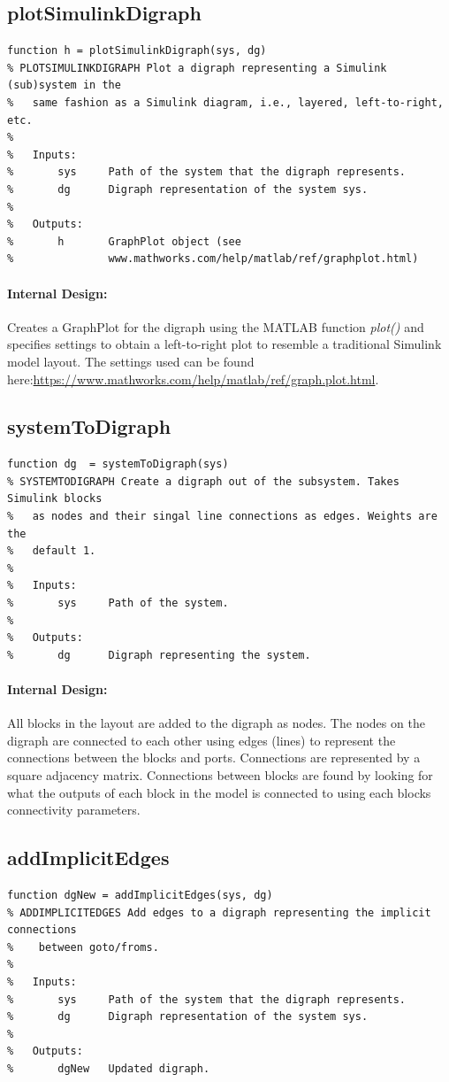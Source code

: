 \documentclass[12pt,letterpaper]{report}
\begin{document}
\subsection{plotSimulinkDigraph}
\begin{lstlisting}
function h = plotSimulinkDigraph(sys, dg)
% PLOTSIMULINKDIGRAPH Plot a digraph representing a Simulink (sub)system in the
%   same fashion as a Simulink diagram, i.e., layered, left-to-right, etc.
%
%   Inputs:
%       sys     Path of the system that the digraph represents.
%       dg      Digraph representation of the system sys.
%
%   Outputs:
%       h       GraphPlot object (see
%               www.mathworks.com/help/matlab/ref/graphplot.html)
\end{lstlisting}
\paragraph{Internal Design:} Creates a GraphPlot for the digraph using the MATLAB function \textit{plot()} and specifies settings to obtain a left-to-right plot to resemble a traditional Simulink model layout. The settings used can be found here:\url{https://www.mathworks.com/help/matlab/ref/graph.plot.html}.

\subsection{systemToDigraph}
\begin{lstlisting}
function dg  = systemToDigraph(sys)
% SYSTEMTODIGRAPH Create a digraph out of the subsystem. Takes Simulink blocks
%   as nodes and their singal line connections as edges. Weights are the
%   default 1.
%
%   Inputs:
%       sys     Path of the system.
%
%   Outputs:
%       dg      Digraph representing the system.
\end{lstlisting}
\paragraph{Internal Design:} All blocks in the layout are added to the digraph as nodes. The nodes on the digraph are connected to each other using edges (lines) to represent the connections between the blocks and ports. Connections are represented by a square adjacency matrix. Connections between blocks are found by looking for what the outputs of each block in the model is connected to using each blocks connectivity parameters.

\subsection{addImplicitEdges}
\begin{lstlisting}
function dgNew = addImplicitEdges(sys, dg)
% ADDIMPLICITEDGES Add edges to a digraph representing the implicit connections
%    between goto/froms.
%
%   Inputs:
%       sys     Path of the system that the digraph represents.
%       dg      Digraph representation of the system sys.
%
%   Outputs:
%       dgNew   Updated digraph.
\end{lstlisting}
\end{document}
